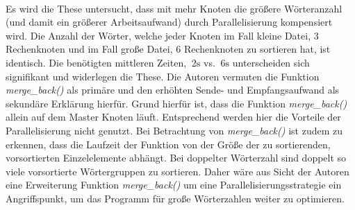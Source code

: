 \\
Es wird die These untersucht, dass mit mehr Knoten die größere Wörteranzahl (und damit ein größerer Arbeitsaufwand) durch Parallelisierung kompensiert wird. Die Anzahl der Wörter, welche jeder Knoten im Fall \glqq kleine Datei, 3 Rechenknoten\grqq{} und im Fall \glqq große Datei, 6 Rechenknoten\grqq{} zu sortieren hat, ist identisch. Die benötigten mittleren Zeiten, $~2\text{s}$ vs. $~6\text{s}$ unterscheiden sich signifikant und widerlegen die These. Die Autoren vermuten die Funktion \textit{merge\_back()} als primäre und den erhöhten Sende- und Empfangsaufwand als sekundäre Erklärung hierfür. Grund hierfür ist, dass die Funktion \textit{merge\_back()} allein auf dem Master Knoten läuft. Entsprechend werden hier die Vorteile der Parallelisierung nicht genutzt. Bei Betrachtung von \textit{merge\_back()} ist zudem zu erkennen, dass die Laufzeit der Funktion von der Größe der zu sortierenden, vorsortierten Einzelelemente abhängt. Bei doppelter Wörterzahl sind doppelt so viele vorsortierte Wörtergruppen zu sortieren. Daher wäre aus Sicht der Autoren eine Erweiterung Funktion \textit{merge\_back()} um eine Parallelisierungsstrategie ein Angriffspunkt, um das Programm für große Wörterzahlen weiter zu optimieren.
